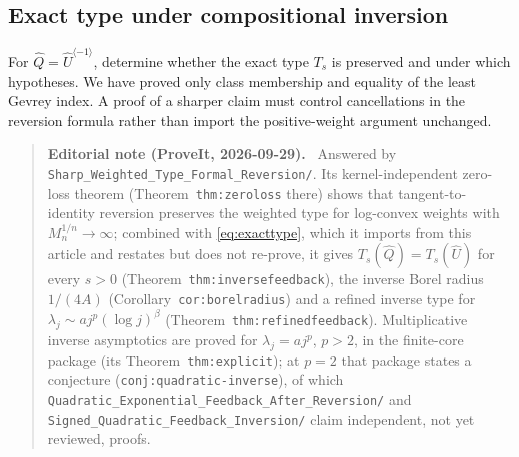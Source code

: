 \documentclass[11pt,a4paper]{article}
\numberwithin{equation}{section}
\theoremstyle{definition}
\theoremstyle{remark}
\newcommand{\Uhat}{\widehat U}
\newcommand{\Qhat}{\widehat Q}
\newenvironment{ednote}{\par\smallskip\begin{quote}\small\raggedright\textbf{Editorial note (ProveIt, 2026-09-29).}\ }{\end{quote}\smallskip}
\begin{document}
\subsection{Exact type under compositional inversion}
For $\Qhat=\Uhat^{\langle-1\rangle}$, determine whether the exact type
$T_s$ is preserved and under which hypotheses.  We have proved only class
membership and equality of the least Gevrey index.  A proof of a sharper
claim must control cancellations in the reversion formula rather than
import the positive-weight argument unchanged.
\begin{ednote}
Answered by \nolinkurl{Sharp_Weighted_Type_Formal_Reversion/}. Its
kernel-independent zero-loss theorem (Theorem~\texttt{thm:zeroloss} there) shows
that tangent-to-identity reversion preserves the weighted type for
log-convex weights with $M_n^{1/n}\to\infty$; combined with
\eqref{eq:exacttype}, which it imports from this article and restates but
does not re-prove, it gives $T_s(\Qhat)=T_s(\Uhat)$ for every $s>0$
(Theorem~\texttt{thm:inversefeedback}), the inverse Borel radius $1/(4A)$
(Corollary~\texttt{cor:borelradius}) and a refined inverse type for
$\lambda_j\sim aj^p(\log j)^\beta$ (Theorem~\texttt{thm:refinedfeedback}).
Multiplicative inverse asymptotics are proved for $\lambda_j=aj^p$,
$p>2$, in the finite-core package (its Theorem~\texttt{thm:explicit}); at $p=2$
that package states a conjecture (\texttt{conj:quadratic-inverse}), of which
\nolinkurl{Quadratic_Exponential_Feedback_After_Reversion/} and
\nolinkurl{Signed_Quadratic_Feedback_Inversion/} claim independent,
not yet reviewed, proofs.
\end{ednote}
\end{document}

